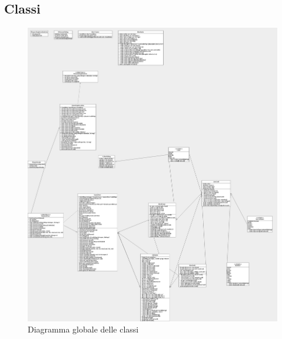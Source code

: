\documentclass[10pt,a4paper]{article}
\begin{document}
\subsection{Classi}
\begin{figure}[H]
\begin{center}
\includegraphics[width=16cm, keepaspectratio]{unogame-sd.png}
\caption{Diagramma globale delle classi}
\end{center}
\end{figure}
\end{document}
